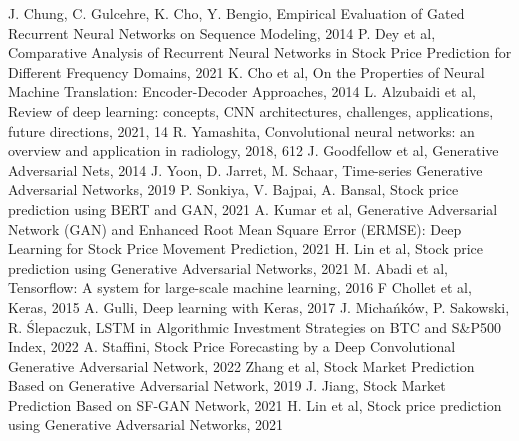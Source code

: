 \documentclass[11pt]{article} %
\begin{document}
\begin{thebibliography}{9}
J. Chung, C. Gulcehre, K. Cho, Y. Bengio, Empirical Evaluation of Gated Recurrent Neural Networks on Sequence Modeling, 2014
P. Dey et al, Comparative Analysis of Recurrent Neural Networks in Stock Price Prediction for Different Frequency Domains, 2021 
K. Cho et al, On the Properties of Neural Machine Translation: Encoder-Decoder Approaches, 2014
L. Alzubaidi et al, Review of deep learning: concepts, CNN architectures, challenges, applications, future directions, 2021, 14
R. Yamashita, Convolutional neural networks: an overview and application in radiology, 2018, 612
J. Goodfellow et al, Generative Adversarial Nets, 2014
J. Yoon, D. Jarret, M. Schaar, Time-series Generative Adversarial Networks, 2019
P. Sonkiya, V. Bajpai, A. Bansal, Stock price prediction using BERT and GAN, 2021
A. Kumar et al, Generative Adversarial Network (GAN) and Enhanced Root Mean Square Error (ERMSE): Deep Learning for Stock Price Movement Prediction, 2021
H. Lin et al, Stock price prediction using Generative Adversarial Networks, 2021 
M. Abadi et al, Tensorflow: A system for large-scale machine learning, 2016
F Chollet et al, Keras, 2015
A. Gulli,  Deep learning with Keras, 2017
J. Michańków, P. Sakowski, R. Ślepaczuk, LSTM in Algorithmic Investment Strategies on BTC and S\&P500 Index, 2022
A. Staffini, Stock Price Forecasting by a Deep Convolutional Generative Adversarial Network, 2022
Zhang et al, Stock Market Prediction Based on Generative Adversarial Network, 2019
J. Jiang, Stock Market Prediction Based on SF-GAN Network, 2021
H. Lin et al, Stock price prediction using Generative Adversarial Networks, 2021

\end{thebibliography}
\end{document}
